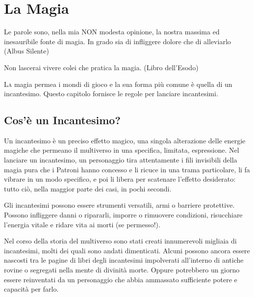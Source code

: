 \section{La Magia}


\label{la-magia}
\begin{tcolorbox}[enhanced,arc=5pt,boxrule=0.3pt]{
Le parole sono, nella mia NON modesta opinione, la nostra massima ed inesauribile fonte di magia. In grado sia di infliggere dolore che di alleviarlo (Albus Silente)

\medskip

Non lascerai vivere colei che pratica la magia. (Libro dell'Esodo)} \end{tcolorbox} \medskip


\begin{multicols}{2}

\lettrine[lines=2, lhang=0.33, loversize=0.25, findent=1.5em]{L}{a} magia permea i mondi di gioco e la sua forma più comune è quella di un incantesimo. Questo capitolo fornisce le regole per lanciare incantesimi. 

\medskip

\subsection{Cos'è un Incantesimo?}

Un incantesimo è un preciso effetto magico, una singola alterazione delle energie magiche che permeano il multiverso in una specifica, limitata, espressione. Nel lanciare un incantesimo, un personaggio tira attentamente i fili invisibili della magia pura che i Patroni hanno concesso e li ricuce in una trama particolare, li fa vibrare in un modo specifico, e poi li libera per scatenare l'effetto desiderato: tutto ciò, nella maggior parte dei casi, in pochi secondi.

Gli incantesimi possono essere strumenti versatili, armi o barriere protettive. Possono infliggere danni o ripararli, imporre o rimuovere condizioni, risucchiare l'energia vitale e ridare vita ai morti (se permesso!).

Nel corso della storia del multiverso sono stati creati innumerevoli migliaia di incantesimi, molti dei quali sono andati dimenticati. Alcuni possono ancora essere nascosti tra le pagine di libri degli incantesimi impolverati all'interno di antiche rovine o segregati nella mente di divinità morte. Oppure potrebbero un giorno essere reinventati da un personaggio che abbia ammassato sufficiente potere e capacità per farlo.


\end{multicols}
